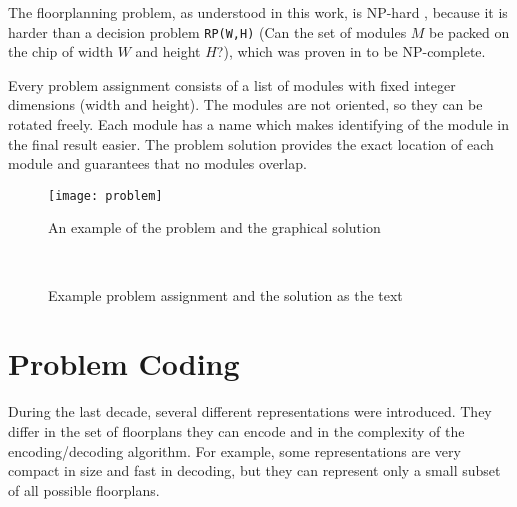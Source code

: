 The floorplanning problem, as understood in this work, is NP-hard \cite{nphard}, because it is harder than a decision problem {\tt RP(W,H)} (Can the set of modules $M$ be packed on the chip of width $W$ and height $H$?), which was proven in \cite{amir} to be NP-complete.

Every problem assignment consists of a list of modules with fixed integer dimensions (width and height). The modules are not oriented, so they can be rotated freely. Each module has a name which makes identifying of the module in the final result easier. The problem solution provides the exact location of each module and guarantees that no modules overlap. 

\begin{figure}
\centering
\texttt{[image: problem]}
\caption{An example of the problem and the graphical solution}
\label{fig:problem}
\end{figure}

\begin{figure}
\centering
{} \hfill
{} \\
\caption{Example problem assignment and the solution as the text}
\label{fig:sample}
\end{figure}

\section{Problem Coding}

During the last decade, several different representations were introduced. They differ in the set of floorplans they can encode and in the complexity of the encoding/decoding algorithm. For example, some representations are very compact in size and fast in decoding, but they can represent only a small subset of all possible floorplans.

